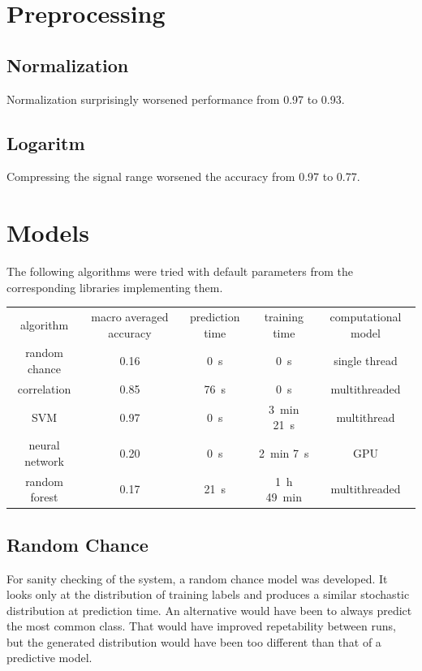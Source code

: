 \documentclass{article}
\begin{document}
\section{Preprocessing}
\subsection{Normalization}
Normalization surprisingly worsened performance from 0.97 to 0.93.


\subsection{Logaritm}
Compressing the signal range worsened the accuracy from 0.97 to 0.77.


\section{Models}
The following algorithms were tried with default parameters from the corresponding libraries implementing them.
\\ \par
{}
\begin{tabular}{ c | c | c | c | c }
algorithm      & macro averaged accuracy & prediction time  & training time                    & computational model \\
random chance  & 0.16                    & \SI{0}{\second}  & \SI{0}{\second}                  & single thread \\
correlation    & 0.85                    & \SI{76}{\second} & \SI{0}{\second}                  & multithreaded \\
SVM            & 0.97                    & \SI{0}{\second}  & \SI{3}{\minute} \SI{21}{\second} & multithread \\
neural network & 0.20                    & \SI{0}{\second}  & \SI{2}{\minute} \SI{7}{\second}  & GPU \\  %
random forest  & 0.17                    & \SI{21}{\second} & \SI{1}{\hour} \SI{49}{\minute}   & multithreaded \\  %
\end{tabular}


\subsection{Random Chance}
For sanity checking of the system, a random chance model was developed.
It looks only at the distribution of training labels and produces a similar stochastic distribution at prediction time.
An alternative would have been to always predict the most common class.
That would have improved repetability between runs, but the generated distribution would have been too different than that of a predictive model.
\end{document}
